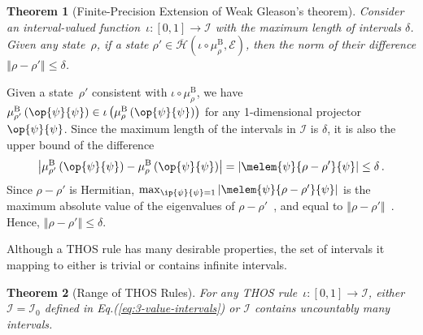 \documentclass[english,reprint, aps, prl,superscriptaddress, showpacs,
showkeys, longbibliography, amsmath, amssymb, floatfix]{revtex4-1}
\theoremstyle{plain}
\newtheorem{thm}{Theorem}
\theoremstyle{definition}
\newcommand{\Hilb}{\mathcal{H}}
\newcommand{\events}{\ensuremath{\mathcal{E}}}
\newcommand{\proj}[1]{\op{#1}{#1}}
\newcommand{\coreBorn}{\ensuremath{\overline{\Hilb}}}
\begin{document}
\begin{thm}[Finite-Precision Extension of Weak Gleason's theorem]\label{thm:Finite-precision-Gleason}Consider
an interval-valued function~$\iota:\left[0,1\right]\rightarrow\mathscr{I}$
with the maximum length of intervals $\delta$. Given any state~$\rho$,
if a state $\rho'\in\coreBorn\left(\iota\circ\mu_{\rho}^{\mathrm{B}},\events\right)$,
then the norm of their difference $\left\Vert \rho-\rho'\right\Vert \le\delta$.\end{thm}

Given a state~$\rho'$ consistent with $\iota\circ\mu_{\rho}^{\mathrm{B}}$,
we have $\mu_{\rho'}^{\mathrm{B}}\left(\proj{\psi}\right)\in\iota\left(\mu_{\rho}^{\mathrm{B}}\left(\proj{\psi}\right)\right)$
for any 1-dimensional projector~$\proj{\psi}$. Since the maximum
length of the intervals in $\mathscr{I}$ is $\delta$, it is also
the upper bound of the difference 
\[
\left|\mu_{\rho'}^{\mathrm{B}}\left(\proj{\psi}\right)-\mu_{\rho}^{\mathrm{B}}\left(\proj{\psi}\right)\right|=\left|\melem{\psi}{\rho-\rho'}{\psi}\right|\le\delta\,.
\]
Since $\rho-\rho'$ is Hermitian, $\max_{\ip{\psi}{\psi}=1}\left|\melem{\psi}{\rho-\rho'}{\psi}\right|$
is the maximum absolute value of the eigenvalues of $\rho-\rho'$~\citep{544199},
and equal to $\left\Vert \rho-\rho'\right\Vert $~\citep{GolubVanLoan1996,Foucart2012}.
Hence, $\left\Vert \rho-\rho'\right\Vert \le\delta$.

Although a THOS rule has many desirable properties, the set of intervals
it mapping to either is trivial or contains infinite intervals.

\begin{thm}[Range of THOS Rules]\label{thm:convex-uncountable}For
any THOS rule~$\iota:\left[0,1\right]\rightarrow\mathscr{I}$, either
$\mathscr{I}=\mathscr{I}_{0}$ defined in Eq.(\ref{eq:3-value-intervals})
or $\mathscr{I}$ contains uncountably many intervals.\end{thm}
\end{document}
